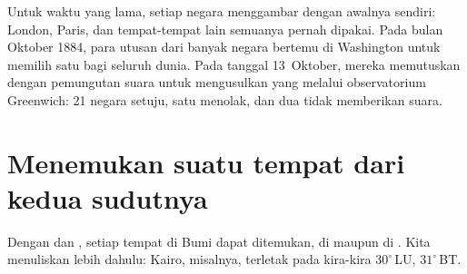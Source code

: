 \begin{history}
Untuk waktu yang lama, setiap negara menggambar  dengan 
awalnya sendiri: London, Paris, dan tempat-tempat lain semuanya pernah
dipakai. Pada bulan Oktober 1884, para utusan dari banyak negara bertemu di
Washington untuk memilih satu  bagi seluruh dunia. Pada
tanggal 13~Oktober, mereka memutuskan dengan pemungutan suara untuk
mengusulkan  yang melalui observatorium Greenwich: 21 negara
setuju, satu menolak, dan dua tidak memberikan suara.
\end{history}

\section{Menemukan suatu tempat dari kedua sudutnya}

Dengan  dan , setiap tempat di Bumi dapat ditemukan, di 
maupun di . Kita menuliskan  lebih dahulu: Kairo,
misalnya, terletak pada kira-kira $30^\circ$\,LU, $31^\circ$\,BT.

